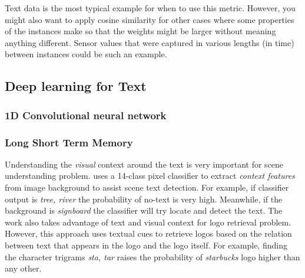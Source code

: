 \documentclass[phd,tocprelim]{cornell}
\begin{document}
Text data is the most typical example for when to use this metric. However, you might also want to apply cosine similarity for other cases where some properties of the instances make so that the weights might be larger without meaning anything different. Sensor values that were captured in various lengths (in time) between instances could be such an example.







\subsection{Deep learning for Text}
\subsubsection{1D Convolutional neural network}
\subsubsection{Long Short Term Memory}

Understanding the  \textit{visual} context around the text is very important for scene understanding problem.   \cite{zhu2016could} uses a 14-class pixel classifier to extract \textit{context features} from image background to assist scene text detection. 
 For example, if classifier output is \textit{tree, river} the probability of no-text is very high. Meanwhile, if the background is \textit{signboard} the classifier will try locate and detect the text. 
 The work \cite{karaoglu2017text} also takes advantage of text and visual context for logo retrieval problem. However, this approach uses textual cues to retrieve logos based on the relation between text that appears in the logo and the logo itself. 
 For example, finding the character trigrams \textit{sta, tar} raises the probability of \textit{starbucks} logo higher than any other.
 
\end{document}
